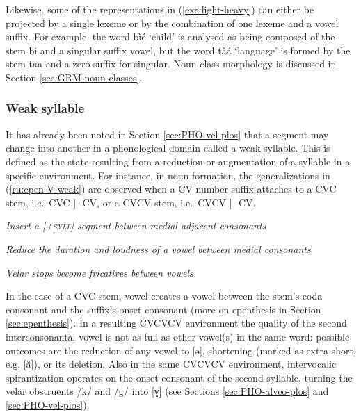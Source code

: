 Likewise,  some of the representations in (\ref{exe:light-heavy}) can
either be
projected by a single lexeme or by the combination of  one lexeme and a vowel
suffix.  For example,  the word {\sls bìé} `child' is analysed as being 
composed of the
stem {\sls bi}    and a singular suffix vowel, but the word {\sls tàá}  
`language' is  formed by the stem {\sls taa}  and a  zero-suffix for
singular.   Noun class morphology is discussed in Section 
\ref{sec:GRM-noun-classes}. 

 


\subsubsection{Weak syllable}
\label{sec:PHO-weak-syll}

It has already been noted in Section \ref{sec:PHO-vel-plos} that a segment may 
change into another in a phonological domain called a weak syllable.  This is  
defined  as the state resulting from a reduction or augmentation of a syllable 
in a specific environment.  For instance, in noun formation, the 
generalizations in 
(\ref{ru:epen-V-weak}) are observed when a CV number suffix attaches to a CVC 
stem, i.e.\ CVC ] -CV, or a CVCV stem, i.e.\ CVCV ] -CV. 



\ea\label{ru:epen-V-weak}
\par\nobreak\smallskip
 {\it Insert a \textsc{[+syll]} segment between medial adjacent 
consonants}

\par\nobreak\smallskip
 {\it Reduce the duration and loudness of a vowel between medial consonants}

\par\nobreak\smallskip
 {\it Velar stops become fricatives between vowels}

\z
\z

In the case of a CVC stem, vowel  creates a vowel between the stem's coda consonant and the suffix's onset consonant (more on epenthesis in Section \ref{sec:epenthesis}).   In a resulting CVCVCV environment the quality of the second interconsonantal vowel  is not  as full as other vowel(s) in the same word: possible outcomes are the reduction of any vowel to [{ə}],  shortening  (marked as extra-short, e.g.  [{ă}]),  or its  deletion. Also in the same CVCVCV environment, intervocalic spirantization operates on the onset consonant of the second syllable,  turning the velar obstruents /{k}/ and /{g}/ into [{ɣ}] (see Sections \ref{sec:PHO-alveo-plos} and \ref{sec:PHO-vel-plos}). 



